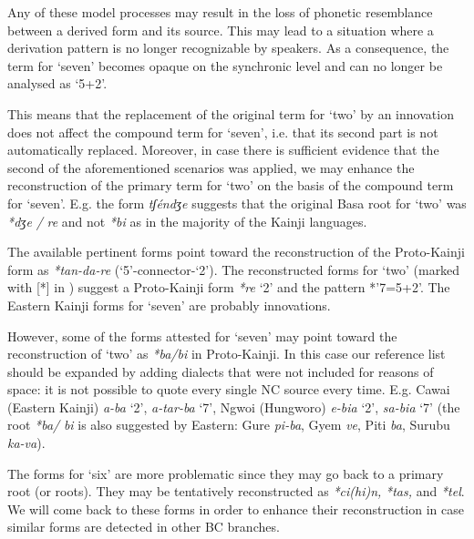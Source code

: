 Any of these model processes may result in the loss of phonetic resemblance between a derived form and its source. This may lead to a situation where a derivation pattern is no longer recognizable by speakers. As a consequence, the term for ‘seven’ becomes opaque on the synchronic level and can no longer be analysed as ‘5+2’.

This means that the replacement of the original term for ‘two’ by an innovation does not affect the compound term for ‘seven’, i.e. that its second part is not automatically replaced. Moreover, in case there is sufficient evidence that the second of the aforementioned scenarios was applied, we may enhance the reconstruction of the primary term for ‘two’ on the basis of the compound term for ‘seven’. E.g. the form \textit{tʃéndʒe} suggests that the original Basa root for ‘two’ was \textit{*dʒe} \textit{/} \textit{re} and not \textit{*bi} as in the majority of the Kainji languages.

The available pertinent forms point toward the reconstruction of the Proto-Kainji form as  \textit{*tan-da-re} (‘5’-connector-‘2’). The reconstructed forms for ‘two’ (marked with [*] in ) suggest a Proto-Kainji form \textit{*re} ‘2’ and the pattern *’7=5+2’. The Eastern Kainji forms for ‘seven’ are probably innovations.

However, some of the forms attested for ‘seven’ may point toward the reconstruction of ‘two’ as \textit{*ba/bi} in Proto-Kainji. In this case our reference list should be expanded by adding dialects that were not included for reasons of space: it is not possible to quote every single NC source every time. E.g. Cawai (Eastern Kainji) \textit{a-ba} ‘2’, \textit{a-tar-ba} ‘7’, Ngwoi (Hungworo) \textit{e-bia} ‘2’, \textit{sa-bia} ‘7’ (the root \textit{*ba/} \textit{bi} is also suggested by Eastern: Gure \textit{pi-ba}, Gyem \textit{ve}, Piti \textit{ba}, Surubu \textit{ka-va}).

The forms  for ‘six’ are more problematic since they may go back to a primary root (or roots). They may be tentatively reconstructed as \textit{*ci(hi)n,} \textit{*tas,} and \textit{*tel}. We will come back to these forms in order to enhance their reconstruction in case similar forms are detected in other BC branches. 


